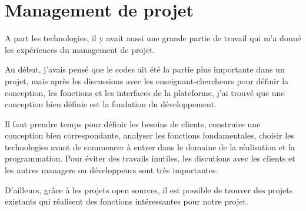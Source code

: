 \section{Management de projet}

A part les technologies, il y avait aussi une grande partie de travail qui m'a donné les expériences du management de projet.

Au début, j'avais pensé que le codes ait été la partie plus importante dans un projet, mais après les discussions avec les enseignant-chercheurs pour définir la conception, les fonctions et les interfaces de la plateforme, j'ai trouvé que une conception bien définie est la fondation du développement. 

Il faut prendre temps pour définir les besoins de clients, construire une conception bien correspondante, analyser les fonctions fondamentales, choisir les technologies avant de commencer à entrer dans le domaine de la réalisation et la programmation. Pour éviter des travails inutiles, les discutions avec les clients et les autres managers ou développeurs sont très importantes. 

D'ailleurs, grâce à les projets open sources, il est possible de trouver des projets existants qui réalisent des fonctions intéressantes pour notre projet.